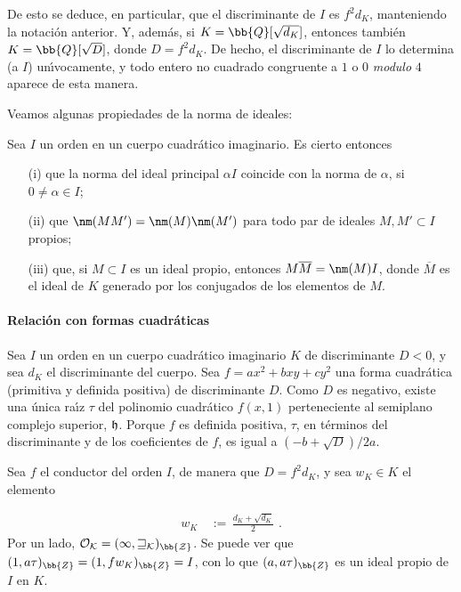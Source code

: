 De esto se deduce, en particular, que el discriminante de $I$ es
$f^{2}d_{K}$, manteniendo la notaci\'{o}n anterior. Y, adem\'{a}s,
si $K=\bb{Q}[\sqrt{d_{K}}]$, entonces tambi\'{e}n
$K=\bb{Q}[\sqrt{D}]$, donde $D=f^{2}d_{K}$. De hecho, el discriminante
de $I$ lo determina (a $I$) un\'{\i}vocamente, y todo entero
no cuadrado congruente a $1$ o $0$ \textit{modulo} $4$ aparece de esta
manera.

Veamos algunas propiedades de la norma de ideales:

\begin{normaIdealesPropis}
Sea $I$ un orden en un cuerpo cuadr\'{a}tico imaginario. Es cierto
entonces

\begin{itemize}
\item[(i)] que la norma del ideal principal $\alpha I$ coincide con la
norma de $\alpha$, si $0\not =\alpha\in I$;
\item[(ii)] que $\nm(MM')=\nm(M)\nm(M')$ para
todo par de ideales $M,M'\subset I$ propios;
\item[(iii)] que, si $M\subset I$ es un ideal propio, entonces
$M\overline{M}=\nm(M)I$, donde $\overline{M}$
es el ideal de $K$ generado por los conjugados de los elementos
de $M$.
\end{itemize}
\end{normaIdealesPropis}

\paragraph{Relaci\'{o}n con formas cuadr\'{a}ticas}
Sea $I$ un orden en un cuerpo cuadr\'{a}tico imaginario $K$ de
discriminante $D<0$, y sea $d_{K}$ el discriminante del cuerpo.
Sea $f=ax^{2}+bxy+cy^{2}$ una forma cuadr\'{a}tica (primitiva y
definida positiva) de discriminante $D$. Como $D$ es negativo, existe
una \'{u}nica ra\'{\i}z $\tau$ del polinomio cuadr\'{a}tico $f(x,1)$
perteneciente al semiplano complejo superior, $\frak{h}$. Porque $f$
es definida positiva, $\tau$, en t\'{e}rminos del discriminante y de
los coeficientes de $f$, es igual a $(-b+\sqrt{D})/2a$.

Sea $f$ el conductor del orden $I$, de manera que $D=f^{2}d_{K}$, y sea
$w_{K}\in K$ el elemento

\begin{align*}
w_{K} & \,:=\,\frac{d_{K}+\sqrt{d_{K}}}{2}
\text{ .}
\end{align*}
Por un lado, $\cal{O}_{K}=(1,w_{K})_{\bb{Z}}$. Se puede ver que
$(1,a\tau)_{\bb{Z}}=(1,fw_{K})_{\bb{Z}}=I$, con lo que
$(a,a\tau)_{\bb{Z}}$ es un ideal propio de $I$ en $K$.

